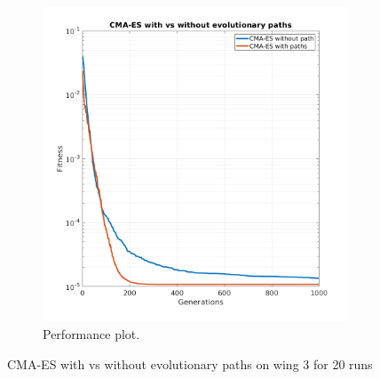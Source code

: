 \documentclass{article}
\begin{document}
\begin{itemize}
\begin{itemize}
\begin{figure}[http]
\begin{subfigure}[b]{.45\linewidth}
			\end{subfigure}
			\centering
			\begin{subfigure}[b]{.52\linewidth}
				\includegraphics[scale = 0.3]{img/CMAES_vs_CMAES.png}
				\caption{Performance plot.}
				
			\end{subfigure}
			\caption{CMA-ES with vs without evolutionary paths on wing 3 for 20 runs}
		\end{figure} 
		\color{black}
		\end{itemize}
\end{itemize}

\newpage
\end{document}
